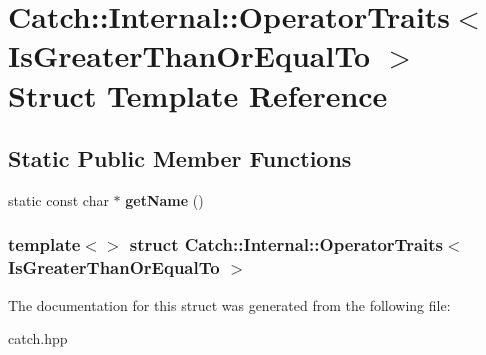 \hypertarget{structCatch_1_1Internal_1_1OperatorTraits_3_01IsGreaterThanOrEqualTo_01_4}{
\section{Catch::Internal::OperatorTraits$<$ IsGreaterThanOrEqualTo $>$ Struct Template Reference}
\label{structCatch_1_1Internal_1_1OperatorTraits_3_01IsGreaterThanOrEqualTo_01_4}
}
\subsection*{Static Public Member Functions}
\begin{DoxyCompactItemize}
\item 
\hypertarget{structCatch_1_1Internal_1_1OperatorTraits_3_01IsGreaterThanOrEqualTo_01_4_a76b6f6b0dbaf7d19ebb1b4b4891e719e}{
static const char $\ast$ {\bfseries getName} ()}
\label{structCatch_1_1Internal_1_1OperatorTraits_3_01IsGreaterThanOrEqualTo_01_4_a76b6f6b0dbaf7d19ebb1b4b4891e719e}

\end{DoxyCompactItemize}
\subsubsection*{template$<$$>$ struct Catch::Internal::OperatorTraits$<$ IsGreaterThanOrEqualTo $>$}



The documentation for this struct was generated from the following file:\begin{DoxyCompactItemize}
\item 
catch.hpp\end{DoxyCompactItemize}
